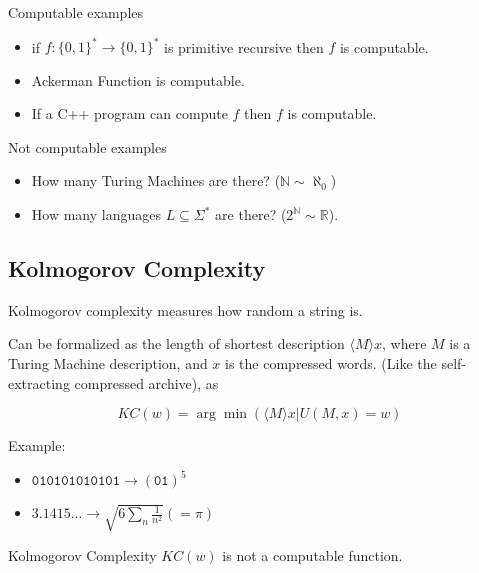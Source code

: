 \begin{observation}


Computable examples

\begin{itemize}
\item
  if \(f: \{0,1\}^* \rightarrow \{0,1\}^*\) is primitive recursive then
  \(f\) is computable.
\item
  Ackerman Function is computable.
\item
  If a C++ program can compute \(f\) then \(f\) is computable.
\end{itemize}

Not computable examples

\begin{itemize}
\item
  How many Turing Machines are there? (\(\mathbb{N} \sim \aleph_0\))
\item
  How many languages \(L \subseteq \Sigma^*\) are there?
  (\(2^{\mathbb{N}} \sim \mathbb{R}\)).
\end{itemize}
\end{observation}

\subsection{Kolmogorov Complexity}

\begin{definition}
Kolmogorov complexity measures how random a string is.

Can be formalized as the length of shortest description
\(\langle M\rangle x\), where \(M\) is a Turing Machine description, and
\(x\) is the compressed words. (Like the self-extracting compressed
archive), as

$$KC(w) = \arg\min( \langle M \rangle x| U(M,x) = w)$$

\end{definition}

Example:

\begin{itemize}
\item
  \(\texttt{010101010101} \rightarrow (\texttt{01})^5\)
\item
  \(3.1415... \rightarrow \sqrt{6 \sum_n{\frac{1}{n^2}}} (= \pi)\)
\end{itemize}

\begin{theorem}
Kolmogorov Complexity \(KC(w)\) is not a computable
function.
\end{theorem}

